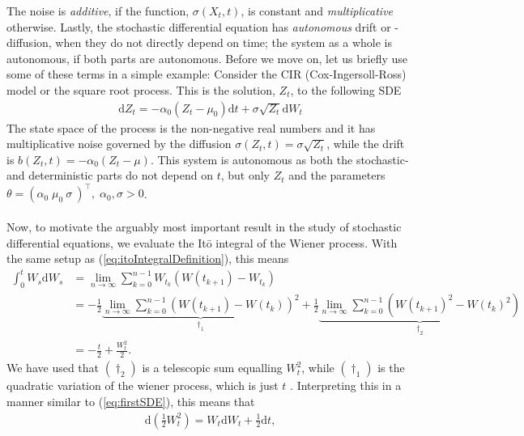 The noise is \textit{additive}, if the function, $\sigma(X_t, t)$, is constant and \textit{multiplicative} otherwise. Lastly, the stochastic differential equation has \textit{autonomous} drift or -diffusion, when they do not directly depend on time; the system as a whole is autonomous, if both parts are autonomous. Before we move on, let us briefly use some of these terms in a simple example: Consider the CIR (Cox-Ingersoll-Ross) model or the square root process. This is the solution, $Z_t$, to the following SDE
\begin{align}
    \mathrm{d}Z_t = -\alpha_0\left(Z_t - \mu_0\right)\mathrm{d}t + \sigma\sqrt{Z_t}\mathrm{d}W_t \label{eq:CIR_process}
\end{align}
The state space of the process is the non-negative real numbers and it has multiplicative noise governed by the diffusion $\sigma\left(Z_t, t\right) = \sigma\sqrt{Z_t}$, while the drift is $b(Z_t, t) = -\alpha_0\left(Z_t - \mu\right)$. This system is autonomous as both the stochastic- and deterministic parts do not depend on $t$, but only $Z_t$ and the parameters  $\theta = \left(\alpha_0\; \mu_0\: \sigma\:\right)^\top,\; \alpha_0, \sigma>0$.\\\\
Now, to motivate the arguably most important result in the study of stochastic differential equations, we evaluate the Itō integral of the Wiener process. With the same setup as (\ref{eq:itoIntegralDefinition}), this means
\begin{align}
    \int_0^t W_s \mathrm{d}W_s & = \lim_{n \to \infty}\sum_{k = 0}^{n-1} W_{t_k}\left(W(t_{k + 1}) - W_{t_k}\right) \nonumber \\ 
    & = - \frac{1}{2}\underbrace{\lim_{n \to \infty}\sum_{k = 0}^{n-1} \left(W(t_{k + 1}) - W(t_{k})\right)^2}_{\dagger_1}  + \frac{1}{2}\underbrace{\lim_{n \to \infty}\sum_{k = 0}^{n-1}\left(W(t_{k + 1})^2 - W(t_{k})^2\right)}_{\dagger_2} \nonumber \\
    & = -\frac{t}{2} + \frac{W_t^2}{2}.
\end{align}
We have used that $(\dagger_2)$ is a telescopic sum equalling $W_t^2$, while $(\dagger_1)$ is the quadratic variation of the wiener process, which is just $t$ \cite[theorem 11.34]{Hansen2022}. Interpreting this in a manner similar to (\ref{eq:firstSDE}), this means that
\begin{align}
    \mathrm{d}\left(\frac{1}{2}W_t^2\right) = W_t\mathrm{d}W_t + \frac{1}{2}\mathrm{d}t, \label{eq:BrownianMotionDerivative}
\end{align}

